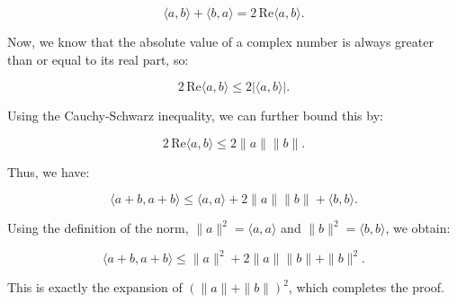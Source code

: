 \[
\langle a, b \rangle + \langle b, a \rangle = 2 \, \text{Re} \langle a, b \rangle.
\]

Now, we know that the absolute value of a complex number is always greater than or equal to its real part, so:

\[
2 \, \text{Re} \langle a, b \rangle \leq 2 |\langle a, b \rangle|.
\]

Using the Cauchy-Schwarz inequality, we can further bound this by:

\[
2 \, \text{Re} \langle a, b \rangle \leq 2 \|a\| \|b\|.
\]

Thus, we have:

\[
\langle a + b, a + b \rangle \leq \langle a, a \rangle + 2 \|a\| \|b\| + \langle b, b \rangle.
\]

Using the definition of the norm, \( \|a\|^2 = \langle a, a \rangle \) and \( \|b\|^2 = \langle b, b \rangle \), we obtain:

\[
\langle a + b, a + b \rangle \leq \|a\|^2 + 2 \|a\| \|b\| + \|b\|^2.
\]

This is exactly the expansion of \( {(\|a\| + \|b\|)}^2 \), which completes the proof.
\QED

